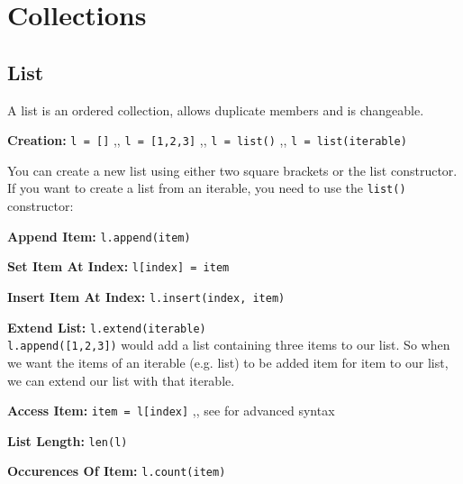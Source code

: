 \section{Collections}

    \subsection{List} \label{List}
        A list is an ordered collection, allows duplicate members and is changeable.

        \begin{indentblock}

            \textbf{Creation:} \texttt{l = []} \sep{,} \texttt{l = [1,2,3]}
            \sep{,} \texttt{l = list()} \sep{,} \texttt{l = list(iterable)}

            You can create a new list using either two square brackets or the list constructor.
            If you want to create a list from an iterable, you need to use the
            \texttt{list()} constructor:


            \textbf{Append Item:} \texttt{l.append(item)}

            \textbf{Set Item At Index:} \texttt{l[index] = item}

            \textbf{Insert Item At Index:} \texttt{l.insert(index, item)}

            \textbf{Extend List:} \texttt{l.extend(iterable)} \\
            \texttt{l.append([1,2,3])} would add a list containing three items to our list.
            So when we want the items of an iterable (e.g. list) to be added item for item to our list,
            we can extend our list with that iterable.


            \textbf{Access Item:} \texttt{item = l[index]} \sep{,}
            see  for advanced syntax

            \textbf{List Length:} \texttt{len(l)}

            \textbf{Occurences Of Item:} \texttt{l.count(item)}


\end{indentblock}
